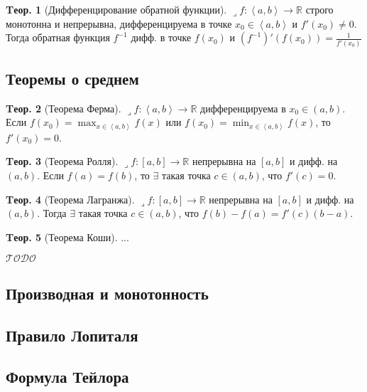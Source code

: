 \documentclass[a4paper,12pt]{article}
\numberwithin{figure}{section}
\theoremstyle{definition}
\newtheorem{theorem}{Tеор.}[section]
\def\DS{\displaystyle}
\def\RR{\mathbb{R}}
\def\on{\!:}
\def\intab{\left<a,b\right>}
\def\lets{{\huge$\lrcorner$}\space}
\def\todo{\guillemotleft$\mathcal{TODO}$\guillemotright\textellipsis}
\begin{document}
\begin{theorem}[Дифференцирование обратной функции]
	\lets $f\on\intab\to\RR$ строго монотонна и непрерывна,
	дифференцируема в точке $x_0 \in\intab$ и $f'(x_0) \ne 0$. \\
	Тогда обратная функция $f^{-1}$ дифф. в точке $f(x_0)$ и
	$\DS \left(f^{-1}\right)'\left(f(x_0)\right) = \frac1{f'(x_0)}$
\end{theorem}


\subsection{Теоремы о среднем}

\begin{theorem}[Теорема Ферма]
	\lets $f\on\intab\to\RR$ дифференцируема в $x_0\in(a,b)$.
	Если $\DS f(x_0)=\max_{x\in\intab}f(x)$ или $f(x_0)=\min_{x\in\intab}f(x)$,
	то $f'(x_0)=0$.
\end{theorem}


\begin{theorem}[Теорема Ролля]
	\lets $f\on[a,b]\to\RR$ непрерывна на $[a,b]$ и дифф. на $(a,b)$.
	Если $f(a)=f(b)$, то $\exists$ такая точка $c\in(a,b)$, что $f'(c)=0$.
\end{theorem}


\begin{theorem}[Теорема Лагранжа]
	\lets $f\on[a,b]\to\RR$ непрерывна на $[a,b]$ и дифф. на $(a,b)$.
	Тогда $\exists$ такая точка $c\in(a,b)$, что $f(b)-f(a)=f'(c)(b-a)$.
\end{theorem}


\begin{theorem}[Теорема Коши]
	...
\end{theorem}

\todo


\subsection{Производная и монотонность}


\subsection{Правило Лопиталя}


\subsection{Формула Тейлора}
\end{document}
